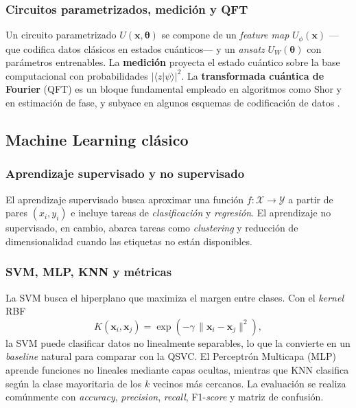 \subsubsection{Circuitos parametrizados, medici\'on y QFT}
Un circuito parametrizado $U(\mathbf{x},\boldsymbol{\theta})$ se compone
de un \textit{feature map} $U_\phi(\mathbf{x})$ ---que codifica datos
cl\'asicos en estados cu\'anticos--- y un \textit{ansatz}
$U_W(\boldsymbol{\theta})$ con par\'ametros entrenables. La
\textbf{medici\'on} proyecta el estado cu\'antico sobre la base
computacional con probabilidades $|\langle z|\psi\rangle|^2$. La
\textbf{transformada cu\'antica de Fourier} (QFT) es un bloque
fundamental empleado en algoritmos como Shor y en estimaci\'on de fase,
y subyace en algunos esquemas de codificaci\'on de datos
\citep{nielsen2010}.

\subsection{Machine Learning cl\'asico}

\subsubsection{Aprendizaje supervisado y no supervisado}
El aprendizaje supervisado busca aproximar una funci\'on
$f:\mathcal{X}\to\mathcal{Y}$ a partir de pares $(x_i, y_i)$ e incluye
tareas de \emph{clasificaci\'on} y \emph{regresi\'on}. El aprendizaje
no supervisado, en cambio, abarca tareas como \textit{clustering} y
reducci\'on de dimensionalidad cuando las etiquetas no est\'an
disponibles.

\subsubsection{SVM, MLP, KNN y m\'etricas}
La SVM busca el hiperplano que maximiza el margen entre clases. Con el
\textit{kernel} RBF
\begin{equation}
K(\mathbf{x}_i, \mathbf{x}_j) =
\exp\!\left(-\gamma\,\|\mathbf{x}_i - \mathbf{x}_j\|^2\right),
\end{equation}
la SVM puede clasificar datos no linealmente separables, lo que la
convierte en un \textit{baseline} natural para comparar con la QSVC.
El Perceptr\'on Multicapa (MLP) aprende funciones no lineales mediante
capas ocultas, mientras que KNN clasifica seg\'un la clase mayoritaria
de los $k$ vecinos m\'as cercanos. La evaluaci\'on se realiza
com\'unmente con \textit{accuracy}, \textit{precision}, \textit{recall},
F1-\textit{score} y matriz de confusi\'on.

